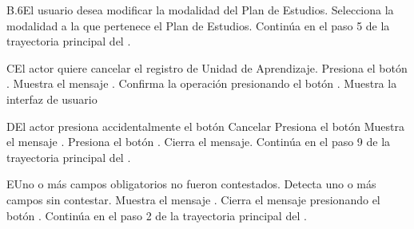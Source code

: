 
\begin{UCtrayectoriaA}{B.6}{El usuario desea modificar la modalidad del Plan de Estudios.}
	\UCpaso[\UCactor] Selecciona la modalidad a la que pertenece el Plan de Estudios.
	\UCpaso Continúa en el paso 5 de la trayectoria principal del .
\end{UCtrayectoriaA}




\begin{UCtrayectoriaA}{C}{El actor quiere cancelar el registro de Unidad de Aprendizaje.}
	\UCpaso[\UCactor] Presiona el botón .
	\UCpaso Muestra el mensaje .
	\UCpaso[\UCactor] Confirma la operación presionando el botón .
	\UCpaso Muestra la interfaz de usuario 
\end{UCtrayectoriaA}




\begin{UCtrayectoriaA}{D}{El actor presiona accidentalmente el botón Cancelar}
	\UCpaso[\UCactor] Presiona el botón 
	\UCpaso Muestra el mensaje .
	\UCpaso[\UCactor] Presiona el botón .
	\UCpaso Cierra el mensaje.
	\UCpaso Continúa en el paso 9 de la trayectoria principal del .
\end{UCtrayectoriaA}




\begin{UCtrayectoriaA}{E}{Uno o más campos obligatorios no fueron contestados.}
	\UCpaso Detecta uno o más campos sin contestar.
	\UCpaso Muestra el mensaje .
	\UCpaso[\UCactor] Cierra el mensaje presionando el botón .
	\UCpaso Continúa en el paso 2 de la trayectoria principal del .
\end{UCtrayectoriaA}